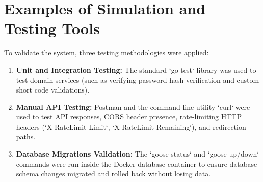 \section{Examples of Simulation and Testing Tools}
To validate the system, three testing methodologies were applied:
\begin{enumerate}
    \item \textbf{Unit and Integration Testing:} The standard `go test` library was used to test domain services (such as verifying password hash verification and custom short code validations).
    \item \textbf{Manual API Testing:} Postman and the command-line utility `curl` were used to test API responses, CORS header presence, rate-limiting HTTP headers (`X-RateLimit-Limit`, `X-RateLimit-Remaining`), and redirection paths.
    \item \textbf{Database Migrations Validation:} The `goose status` and `goose up/down` commands were run inside the Docker database container to ensure database schema changes migrated and rolled back without losing data.
\end{enumerate}
